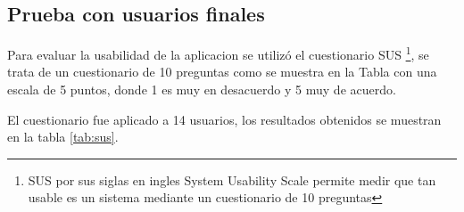 \subsection{Prueba con usuarios finales}
Para evaluar la usabilidad de la aplicacion se utilizó el cuestionario SUS \footnote{SUS por sus siglas en ingles System Usability Scale permite medir que tan usable es un sistema mediante un cuestionario de 10 preguntas }, se trata de un cuestionario de 10 preguntas como se muestra en la Tabla  con una escala de 5 puntos, donde 1 es muy en desacuerdo y 5 muy de acuerdo. 



El cuestionario fue aplicado a 14 usuarios, los resultados obtenidos se muestran en la tabla \ref{tab:sus}.